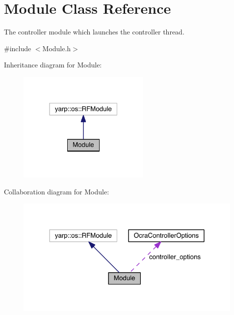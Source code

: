 \hypertarget{classModule}{}\section{Module Class Reference}
\label{classModule}


The controller module which launches the controller thread.  




{\ttfamily \#include $<$Module.\+h$>$}



Inheritance diagram for Module\+:\nopagebreak
\begin{figure}[H]
\begin{center}
\leavevmode
\includegraphics[width=183pt]{classModule__inherit__graph}
\end{center}
\end{figure}


Collaboration diagram for Module\+:\nopagebreak
\begin{figure}[H]
\begin{center}
\leavevmode
\includegraphics[width=316pt]{classModule__coll__graph}
\end{center}
\end{figure}
